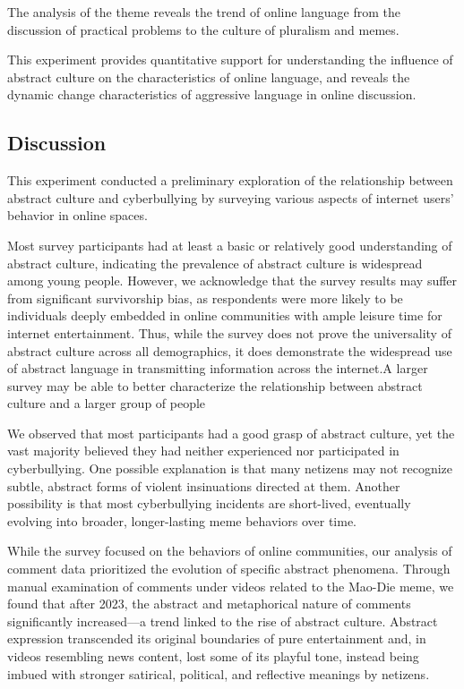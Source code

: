 \documentclass[12pt,a4paper]{ctexart}
\begin{document}
The analysis of the theme reveals the trend of online language from the discussion of practical problems to the culture of pluralism and memes.

This experiment provides quantitative support for understanding the influence of abstract culture on the characteristics of online language, and reveals the dynamic change characteristics of aggressive language in online discussion.

\subsection{Discussion}

This experiment conducted a preliminary exploration of the relationship between abstract culture and cyberbullying by surveying various aspects of internet users' behavior in online spaces.

Most survey participants had at least a basic or relatively good understanding of abstract culture, indicating the prevalence of abstract culture is widespread among young people. However, we acknowledge that the survey results may suffer from significant survivorship bias, as respondents were more likely to be individuals deeply embedded in online communities with ample leisure time for internet entertainment. Thus, while the survey does not prove the universality of abstract culture across all demographics, it does demonstrate the widespread use of abstract language in transmitting information across the internet.A larger survey may be able to better characterize the relationship between abstract culture and a larger group of people

We observed that most participants had a good grasp of abstract culture, yet the vast majority believed they had neither experienced nor participated in cyberbullying. One possible explanation is that many netizens may not recognize subtle, abstract forms of violent insinuations directed at them. Another possibility is that most cyberbullying incidents are short-lived, eventually evolving into broader, longer-lasting meme behaviors over time.

While the survey focused on the behaviors of online communities, our analysis of comment data prioritized the evolution of specific abstract phenomena. Through manual examination of comments under videos related to the Mao-Die meme, we found that after 2023, the abstract and metaphorical nature of comments significantly increased—a trend linked to the rise of abstract culture. Abstract expression transcended its original boundaries of pure entertainment and, in videos resembling news content, lost some of its playful tone, instead being imbued with stronger satirical, political, and reflective meanings by netizens.
\end{document}
